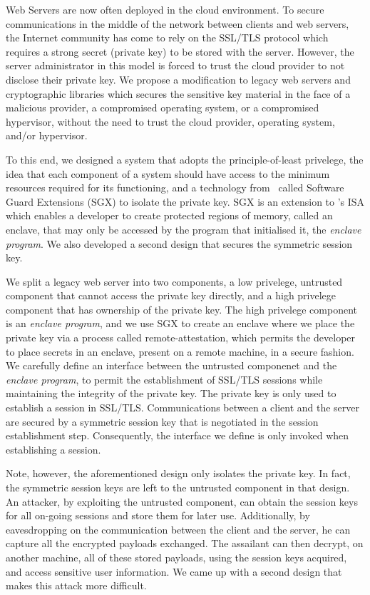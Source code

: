 \documentclass[../main.tex]{subfiles}
\begin{document}
   

Web Servers are now often deployed in the cloud environment. To secure
communications in the middle of the network between clients and web
servers, the Internet community has come to rely on the SSL/TLS
protocol which requires a strong secret (private key) to be stored
with the server. However, the server administrator in this model is
forced to trust the cloud provider to not disclose their private key.
We propose a modification to legacy web servers and cryptographic
libraries which secures the sensitive key material in the face of a
malicious provider, a compromised operating system, or a compromised
hypervisor, without the need to trust the cloud provider, operating
system, and/or hypervisor. 

To this end, we designed a system that adopts the principle-of-least
privelege, the idea that each component of a system should have access
to the minimum resources required for its functioning, and a
technology from \Intel~called Software Guard Extensions (SGX) to
isolate the private key. SGX is an extension to \Intel's ISA which
enables a developer to create protected regions of memory, called an
enclave, that may only be accessed by the program that initialised it,
the \textit{enclave program}. We also developed a second design
that secures the symmetric session key.

We split a legacy web server into two components, a low privelege,
untrusted component that cannot access the private key directly, and a
high privelege component that has ownership of the private key. The
high privelege component is an \textit{enclave program}, and we use
SGX to create an enclave where we place the private key via a process
called remote-attestation, which permits the developer to place
secrets in an enclave, present on a remote machine, in a secure
fashion. We carefully define an interface between the untrusted
componenet and the \textit{enclave program}, to permit the
establishment of SSL/TLS sessions while maintaining the integrity of
the private key. The private key is only used to establish a session
in SSL/TLS. Communications between a client and the server are secured
by a symmetric session key that is negotiated in the session
establishment step. Consequently, the interface we define is only
invoked when establishing a session.

Note, however, the aforementioned design only isolates the private
key. In fact, the symmetric session keys are left to the untrusted
component in that design. An attacker, by exploiting the untrusted
component, can obtain the session keys for all on-going sessions and
store them for later use. Additionally, by eavesdropping on the
communication between the client and the server, he can capture all
the encrypted payloads exchanged. The assailant can then decrypt, on
another machine, all of these stored payloads, using the session keys
acquired, and access sensitive user information. We came up with a
second design that makes this attack more difficult.
\end{document}
